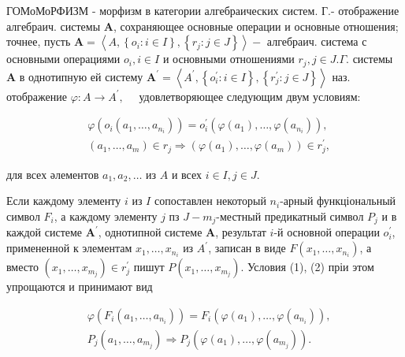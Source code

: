 \documentclass[10pt]{article}
\begin{document}
ГОМоМоРФИЗМ - морфизм в категории алгебраических систем. Г.- отображение алгебраич. системы $\boldsymbol{A}$, сохраняющее основные операции и основные отношения; точнее, пусть $\boldsymbol{A}=\left\langle A,\left\{o_{i}: i \in I\right\},\left\{r_{j}: j \in J\right\}\right\rangle-$ алгебраич. система с основными операциями $o_{i}, i \in I$ и основными отношениями $r_{j}, j \in J . \Gamma$. системы $\boldsymbol{A}$ в однотипную ей систему $\boldsymbol{A}^{\prime}=\left\langle A^{\prime},\left\{o_{i}^{\prime}: i \in I\right\},\left\{r_{j}^{\prime}: j \in J\right\}\right\rangle$ наз. отображение $\varphi: A \rightarrow A^{\prime}, \quad$ удовлетворяющее следующим двум условиям:



\[

\begin{aligned}

& \varphi\left(o_{i}\left(a_{1}, \ldots, a_{n_{i}}\right)\right)=o_{i}^{\prime}\left(\varphi\left(a_{1}\right), \ldots, \varphi\left(a_{n_{i}}\right)\right), \\

& \left(a_{1}, \ldots, a_{m}\right) \in r_{j} \Rightarrow\left(\varphi\left(a_{1}\right), \ldots, \varphi\left(a_{m}\right)\right) \in r_{j}^{\prime},

\end{aligned}

\]



для всех әлементов $a_{1}, a_{2}, \ldots$ из $A$ и всех $i \in I, j \in J$.



Если каждому элементу $i$ из $I$ сопоставлен некоторый $n_{i}$-арный функціональный символ $F_{i}$, а каждому элементу $j$ пз $J-m_{j}$-местный предикатный символ $P_{j}$ и в каждой системе $\boldsymbol{A}^{\prime}$, однотипной системе $\boldsymbol{A}$, результат $i$-й основной операции $o_{i}^{\prime}$, примененной к элементам $x_{1}, \ldots, x_{n_{i}}$ из $A^{\prime}$, записан в виде $F\left(x_{1}, \ldots, x_{n_{i}}\right)$, а вместо $\left(x_{1}, \ldots, x_{m_{j}}\right) \in r_{j}^{\prime}$ пишут $P\left(x_{1}, \ldots, x_{m_{j}}\right)$. Условия (1), (2) пріи этом упрощаются и принимают вид



\[

\begin{aligned}

& \varphi\left(F_{i}\left(a_{1}, \ldots, a_{n_{i}}\right)\right)=F_{i}\left(\varphi\left(a_{1}\right), \ldots, \varphi\left(a_{n_{i}}\right)\right), \\

& P_{j}\left(a_{1}, \ldots, a_{m_{j}}\right) \Rightarrow P_{j}\left(\varphi\left(a_{1}\right), \ldots, \varphi\left(a_{m_{j}}\right)\right) .

\end{aligned}

\]
\end{document}
